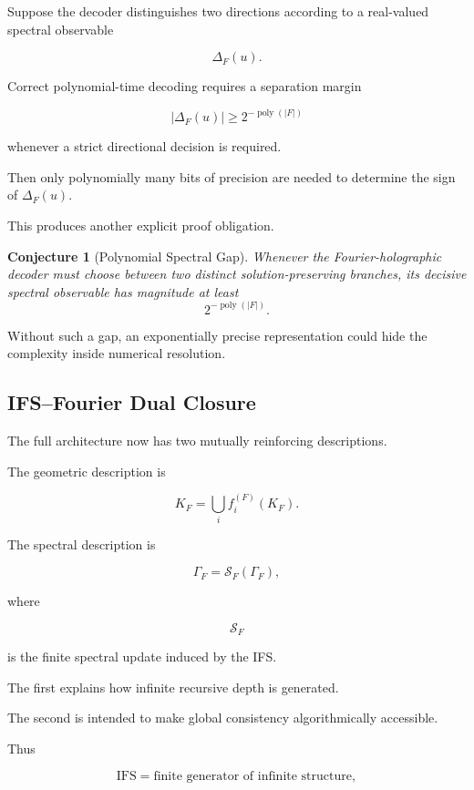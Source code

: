 \documentclass[11pt]{article}
\theoremstyle{plain}
\newtheorem{conjecture}[theorem]{Conjecture}
\theoremstyle{definition}
\begin{document}
Suppose the decoder distinguishes two directions according to a real-valued
spectral observable

\[
    \Delta_F(u).
\]

Correct polynomial-time decoding requires a separation margin

\[
    |\Delta_F(u)|
    \geq
    2^{-\operatorname{poly}(|F|)}
\]

whenever a strict directional decision is required.

Then only polynomially many bits of precision are needed to determine the
sign of \(\Delta_F(u)\).

This produces another explicit proof obligation.

\begin{conjecture}[Polynomial Spectral Gap]
\label{conj:polynomial-spectral-gap}
Whenever the Fourier-holographic decoder must choose between two distinct
solution-preserving branches, its decisive spectral observable has magnitude
at least
\[
    2^{-\operatorname{poly}(|F|)}.
\]
\end{conjecture}

Without such a gap, an exponentially precise representation could hide the
complexity inside numerical resolution.

\subsection{IFS--Fourier Dual Closure}

The full architecture now has two mutually reinforcing descriptions.

The geometric description is

\[
    \boxed{
    K_F
    =
    \bigcup_i f_i^{(F)}(K_F).
    }
\]

The spectral description is

\[
    \boxed{
    \Gamma_F
    =
    \mathcal{S}_F(\Gamma_F),
    }
\]

where

\[
    \mathcal{S}_F
\]

is the finite spectral update induced by the IFS.

The first explains how infinite recursive depth is generated.

The second is intended to make global consistency algorithmically accessible.

Thus

\[
\boxed{
\text{IFS}
=
\text{finite generator of infinite structure},
}
\]
\end{document}
